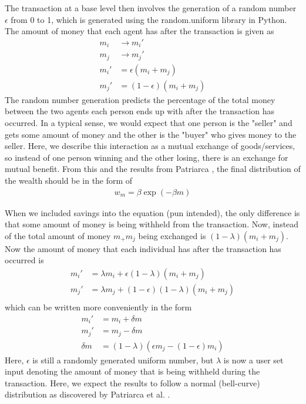 \documentclass[11pt]{article}
\newcommand{\ba}{\[\begin{aligned}}
\newcommand{\ea}{\end{aligned}\]}
\begin{document}
The transaction at a base level then involves the generation of a random number $\epsilon$ from 0 to 1, which is generated using the random.uniform library in Python. The amount of money that each agent has after the transaction is given as
\ba
m_i &\rightarrow m_i'\\
m_j &\rightarrow m_j'\\
m_i' &= \epsilon (m_i+m_j)\\
m_j' &= (1-\epsilon)(m_i+m_j)
\ea
The random number generation predicts the percentage of the total money between the two agents each person ends up with after the transaction has occurred. In a typical sense, we would expect that one person is the "seller" and gets some amount of money and the other is the "buyer" who gives money to the seller. Here, we describe this interaction as a mutual exchange of goods/services, so instead of one person winning and the other losing, there is an exchange for mutual benefit. From this and the results from Patriarca \cite{patriarca}, the final distribution of the wealth should be in the form of 
\ba
w_m=\beta \exp{(-\beta m)}
\ea

When we included savings into the equation (pun intended), the only difference is that some amount of money is being withheld from the transaction. Now, instead of the total amount of money $m_+m_j$ being exchanged is $(1-\lambda)(m_i+m_j)$. Now the amount of money that each individual has after the transaction has occurred is
\ba
m_i' &= \lambda m_i+\epsilon(1-\lambda)(m_i+m_j)\\
m_j' &= \lambda m_j+(1-\epsilon)(1-\lambda)(m_i+m_j)\\
\ea
which can be written more conveniently in the form
\ba
m_i'&=m_i+\delta m\\
m_j'&=m_j-\delta m\\
\delta m &=(1-\lambda)(\epsilon m_j-(1-\epsilon)m_i)
\ea
Here, $\epsilon$ is still a randomly generated uniform number, but $\lambda$ is now a user set input denoting the amount of money that is being withheld during the transaction. Here, we expect the results to follow a normal (bell-curve) distribution as discovered by Patriarca et al. \cite{patriarca}. 
\end{document}
